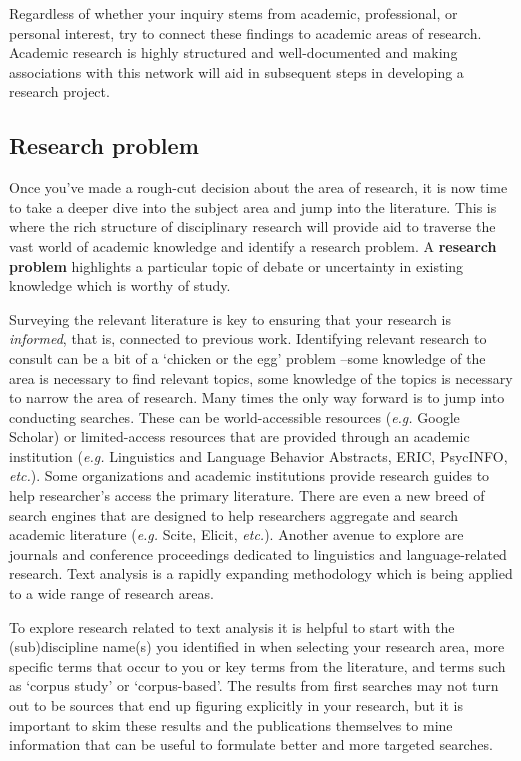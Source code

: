 \documentclass[
  letterpaper,
]{latex/krantz}
\theoremstyle{definition}
\theoremstyle{remark}
\begin{document}
Regardless of whether your inquiry stems from academic, professional, or
personal interest, try to connect these findings to academic areas of
research. Academic research is highly structured and well-documented and
making associations with this network will aid in subsequent steps in
developing a research project.

\subsection{Research problem}\label{sec-research-problem}

Once you've made a rough-cut decision about the area of research, it is
now time to take a deeper dive into the subject area and jump into the
literature. This is where the rich structure of disciplinary research
will provide aid to traverse the vast world of academic knowledge and
identify a research problem. A \textbf{research problem} highlights a
particular topic of debate or uncertainty in existing knowledge which is
worthy of study.

Surveying the relevant literature is key to ensuring that your research
is \emph{informed}, that is, connected to previous work. Identifying
relevant research to consult can be a bit of a `chicken or the egg'
problem --some knowledge of the area is necessary to find relevant
topics, some knowledge of the topics is necessary to narrow the area of
research. Many times the only way forward is to jump into conducting
searches. These can be world-accessible resources (\emph{e.g.} Google
Scholar) or limited-access resources that are provided through an
academic institution (\emph{e.g.} Linguistics and Language Behavior
Abstracts, ERIC, PsycINFO, \emph{etc.}). Some organizations and academic
institutions provide research guides to help researcher's access the
primary literature. There are even a new breed of search engines that
are designed to help researchers aggregate and search academic
literature (\emph{e.g.} Scite, Elicit, \emph{etc.}). Another avenue to
explore are journals and conference proceedings dedicated to linguistics
and language-related research. Text analysis is a rapidly expanding
methodology which is being applied to a wide range of research areas.

To explore research related to text analysis it is helpful to start with
the (sub)discipline name(s) you identified in when selecting your
research area, more specific terms that occur to you or key terms from
the literature, and terms such as `corpus study' or `corpus-based'. The
results from first searches may not turn out to be sources that end up
figuring explicitly in your research, but it is important to skim these
results and the publications themselves to mine information that can be
useful to formulate better and more targeted searches.
\end{document}
